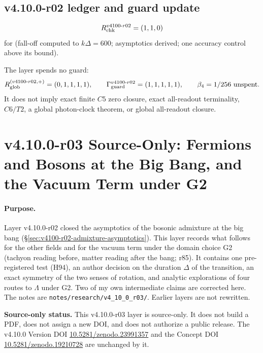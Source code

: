 \subsection*{v4.10.0-r02 ledger and guard update}
\label{subsec:v4100-r02-ledger-guard}

\[
R_{\rm chk}^{v4100\text{-}r02}=(1,1,0)
\]
for (fall-off computed to \(k\Delta=600\); asymptotics derived; one accuracy control above its bound).

The layer spends no guard:
\[
R_{\rm glob}^{(v4100\text{-}r02,+)}=(0,1,1,1,1),
\qquad
\Gamma_{\rm guard}^{v4100\text{-}r02}=(1,1,1,1,1),
\qquad
\beta_4=1/256\ \text{unspent}.
\]
It does not imply exact finite \(C5\) zero closure, exact all-readout terminality,
\(C6/T2\), a global photon-clock theorem, or global all-readout closure.

\clearpage
\section*{v4.10.0-r03 Source-Only: Fermions and Bosons at the Big Bang, and the Vacuum Term under G2}
\label{sec:v4100-r03-bang-g2}

\paragraph{Purpose.}
Layer v4.10.0-r02 closed the asymptotics of the bosonic admixture at the big bang (\S\ref{sec:v4100-r02-admixture-asymptotics}).
This layer records what follows for the other fields and for the vacuum term under the domain choice G2 (tachyon reading before,
matter reading after the bang; r85).  It contains one pre-registered test (H94), an author decision on the duration \(\Delta\) of the
transition, an exact symmetry of the two senses of rotation, and analytic explorations of four routes to \(\Lambda\) under G2.  Two of my own
intermediate claims are corrected here.  The notes are
\texttt{notes/\allowbreak research/\allowbreak v4\_10\_0\_r03/}.  Earlier layers are not rewritten.

\noindent\textbf{Source-only status.}
This v4.10.0-r03 layer is source-only.  It does not build a PDF, does not assign a new DOI,
and does not authorize a public release.  The v4.10.0 Version DOI
\href{https://doi.org/10.5281/zenodo.23991357}{10.5281/zenodo.23991357} and the Concept DOI
\href{https://doi.org/10.5281/zenodo.19210728}{10.5281/zenodo.19210728} are unchanged by it.

